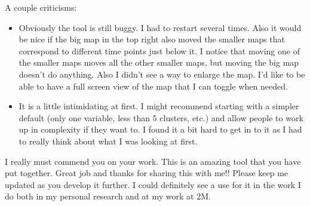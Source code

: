 \documentclass[a4paper]{article}
\begin{document}
A couple criticisms:

\begin{itemize}
  
  \item{Obviously the tool is still buggy. I had to restart several times. Also
  it would be nice if the big map in the top right also moved the smaller maps
  that correspond to different time points just below it. I notice that moving
  one of the smaller maps moves all the other smaller maps, but moving the big
  map doesn’t do anything. Also I didn’t see a way to enlarge the map. I’d like
  to be able to have a full screen view of the map that I can toggle when
  needed.}
  
  \item{It is a little intimidating at first. I might recommend starting with a
  simpler default (only one variable, less than 5 clusters, etc.) and allow
  people to work up in complexity if they want to. I found it a bit hard to get
  in to it as I had to really think about what I was looking at first.}
\end{itemize}

I really must commend you on your work. This is an amazing tool that you have
put together. Great job and thanks for sharing this with me!! Please keep me
updated as you develop it further. I could definitely see a use for it in the
work I do both in my personal research and at my work at 2M.
\end{document}
